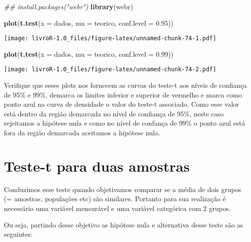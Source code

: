 \documentclass[]{book}
\newenvironment{Shaded}{\begin{snugshade}}{\end{snugshade}}
\newcommand{\CommentTok}[1]{\textcolor[rgb]{0.56,0.35,0.01}{\textit{#1}}}
\newcommand{\DataTypeTok}[1]{\textcolor[rgb]{0.13,0.29,0.53}{#1}}
\newcommand{\FloatTok}[1]{\textcolor[rgb]{0.00,0.00,0.81}{#1}}
\newcommand{\KeywordTok}[1]{\textcolor[rgb]{0.13,0.29,0.53}{\textbf{#1}}}
\newcommand{\NormalTok}[1]{#1}
\begin{document}
\begin{Shaded}
\begin{Highlighting}[]
\CommentTok{## install.packages("webr")}
\KeywordTok{library}\NormalTok{(webr)}
\end{Highlighting}
\end{Shaded}

\begin{Shaded}
\begin{Highlighting}[]
\KeywordTok{plot}\NormalTok{(}\KeywordTok{t.test}\NormalTok{(}\DataTypeTok{x =}\NormalTok{ dados, }\DataTypeTok{mu =}\NormalTok{ teorico, }\DataTypeTok{conf.level =} \FloatTok{0.95}\NormalTok{))}
\end{Highlighting}
\end{Shaded}

\texttt{[image: livroR-1.0\_files/figure-latex/unnamed-chunk-74-1.pdf]}

\begin{Shaded}
\begin{Highlighting}[]
\KeywordTok{plot}\NormalTok{(}\KeywordTok{t.test}\NormalTok{(}\DataTypeTok{x =}\NormalTok{ dados, }\DataTypeTok{mu =}\NormalTok{ teorico, }\DataTypeTok{conf.level =} \FloatTok{0.99}\NormalTok{))}
\end{Highlighting}
\end{Shaded}

\texttt{[image: livroR-1.0\_files/figure-latex/unnamed-chunk-74-2.pdf]}

Verifique que esses plots nos fornecem as curvas do teste-t aos níveis de confiança de 95\% e 99\%, demarca os limites inferior e superior de vermelho e marca como ponto azul na curva de densidade o valor do teste-t associado. Como esse valor está dentro da região demarcada no nível de confiança de 95\%, neste caso rejeitamos a hipótese nula e como no nível de confança de 99\% o ponto azul está fora da região demarcada aceitamos a hipótese nula.

\hypertarget{teste-t-para-duas-amostras}{%
\section{Teste-t para duas amostras}\label{teste-t-para-duas-amostras}}

Conduzimos esse teste quando objetivamos comparar se a média de dois grupos (= amostras, populações etc) são similares. Portanto para sua realização é necessário uma variável mensurável e uma variável categórica com 2 grupos.

Ou seja, partindo desse objetivo as hipótese nula e alternativa desse teste são as seguintes:
\end{document}
